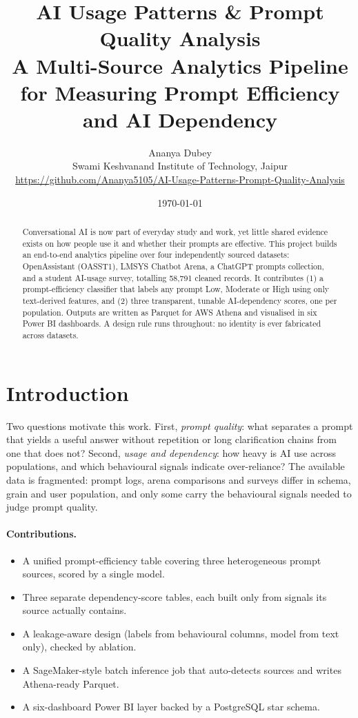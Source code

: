 \documentclass[11pt,a4paper]{article}
\title{\textbf{AI Usage Patterns \& Prompt Quality Analysis}\\[4pt]
\large A Multi-Source Analytics Pipeline for Measuring Prompt Efficiency and AI Dependency}
\author{Ananya Dubey\\
\small Swami Keshvanand Institute of Technology, Jaipur\\
\small \url{https://github.com/Ananya5105/AI-Usage-Patterns-Prompt-Quality-Analysis}}
\date{\today}
\renewcommand{\_}{\textunderscore\hspace{0pt}}
\newif\ifhasresults
\newcommand{\NTotal}{58,791}}
\begin{document}
\maketitle

\begin{abstract}
Conversational AI is now part of everyday study and work, yet little shared evidence exists on how people use it and whether their prompts are effective. This project builds an end-to-end analytics pipeline over four independently sourced datasets: OpenAssistant (OASST1), LMSYS Chatbot Arena, a ChatGPT prompts collection, and a student AI-usage survey, totalling \NTotal{} cleaned records. It contributes (1) a prompt-efficiency classifier that labels any prompt Low, Moderate or High using only text-derived features, \ifhasresults reaching \AccTest{} accuracy on a held-out split, \fi and (2) three transparent, tunable AI-dependency scores, one per population. \ifhasresults A leakage ablation, a length-only baseline and a weight-sensitivity analysis test how far these scores can be trusted. \fi{} Outputs are written as Parquet for AWS Athena and visualised in six Power BI dashboards. A design rule runs throughout: no identity is ever fabricated across datasets.
\end{abstract}

\section{Introduction}
Two questions motivate this work. First, \emph{prompt quality}: what separates a prompt that yields a useful answer without repetition or long clarification chains from one that does not? Second, \emph{usage and dependency}: how heavy is AI use across populations, and which behavioural signals indicate over-reliance? The available data is fragmented: prompt logs, arena comparisons and surveys differ in schema, grain and user population, and only some carry the behavioural signals needed to judge prompt quality.

\paragraph{Contributions.}
\begin{itemize}
  \item A unified prompt-efficiency table covering three heterogeneous prompt sources, scored by a single model.
  \item Three separate dependency-score tables, each built only from signals its source actually contains.
  \item A leakage-aware design (labels from behavioural columns, model from text only), checked by ablation.
  \item A SageMaker-style batch inference job that auto-detects sources and writes Athena-ready Parquet.
  \item A six-dashboard Power BI layer backed by a PostgreSQL star schema.
\end{itemize}
\end{document}
